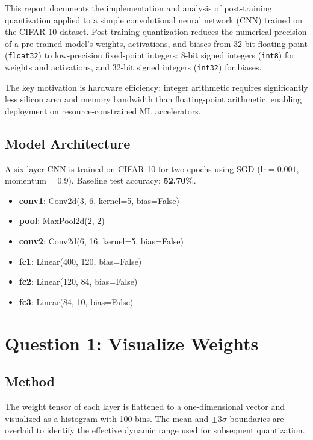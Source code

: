 \documentclass[11pt, letterpaper]{article}
\begin{document}
This report documents the implementation and analysis of post-training
quantization applied to a simple convolutional neural network (CNN) trained
on the CIFAR-10 dataset. Post-training quantization reduces the numerical
precision of a pre-trained model's weights, activations, and biases from
32-bit floating-point (\texttt{float32}) to low-precision fixed-point
integers: 8-bit signed integers (\texttt{int8}) for weights and activations,
and 32-bit signed integers (\texttt{int32}) for biases.

The key motivation is hardware efficiency: integer arithmetic requires
significantly less silicon area and memory bandwidth than floating-point
arithmetic, enabling deployment on resource-constrained ML accelerators.

\subsection{Model Architecture}

A six-layer CNN is trained on CIFAR-10 for two epochs using SGD
(lr$=0.001$, momentum$=0.9$). Baseline test accuracy: \textbf{52.70\%}.

\begin{itemize}
  \item \textbf{conv1}: Conv2d(3, 6, kernel=5, bias=False)
  \item \textbf{pool}: MaxPool2d(2, 2)
  \item \textbf{conv2}: Conv2d(6, 16, kernel=5, bias=False)
  \item \textbf{fc1}: Linear(400, 120, bias=False)
  \item \textbf{fc2}: Linear(120, 84, bias=False)
  \item \textbf{fc3}: Linear(84, 10, bias=False)
\end{itemize}

\section{Question 1: Visualize Weights}

\subsection{Method}

The weight tensor of each layer is flattened to a one-dimensional vector
and visualized as a histogram with 100 bins. The mean and $\pm3\sigma$
boundaries are overlaid to identify the effective dynamic range used for
subsequent quantization.
\end{document}
